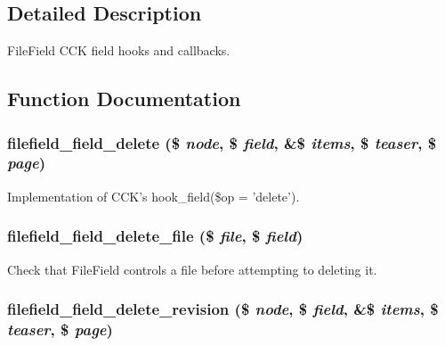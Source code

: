 \subsection{Detailed Description}
FileField CCK field hooks and callbacks. 

\subsection{Function Documentation}
\hypertarget{filefield__field_8inc_4b835916ff7d11082a0b5fc9e6622779}{
\subsubsection[{filefield\_\-field\_\-delete}]{\setlength{\rightskip}{0pt plus 5cm}filefield\_\-field\_\-delete (\$ {\em node}, \/  \$ {\em field}, \/  \&\$ {\em items}, \/  \$ {\em teaser}, \/  \$ {\em page})}}
\label{filefield__field_8inc_4b835916ff7d11082a0b5fc9e6622779}


Implementation of CCK's hook\_\-field(\$op = 'delete'). \hypertarget{filefield__field_8inc_1768f079c1bbd55733755f2f43baf815}{
\subsubsection[{filefield\_\-field\_\-delete\_\-file}]{\setlength{\rightskip}{0pt plus 5cm}filefield\_\-field\_\-delete\_\-file (\$ {\em file}, \/  \$ {\em field})}}
\label{filefield__field_8inc_1768f079c1bbd55733755f2f43baf815}


Check that FileField controls a file before attempting to deleting it. \hypertarget{filefield__field_8inc_26f46f57f945be430fa7e9deace57943}{
\subsubsection[{filefield\_\-field\_\-delete\_\-revision}]{\setlength{\rightskip}{0pt plus 5cm}filefield\_\-field\_\-delete\_\-revision (\$ {\em node}, \/  \$ {\em field}, \/  \&\$ {\em items}, \/  \$ {\em teaser}, \/  \$ {\em page})}}
\label{filefield__field_8inc_26f46f57f945be430fa7e9deace57943}


